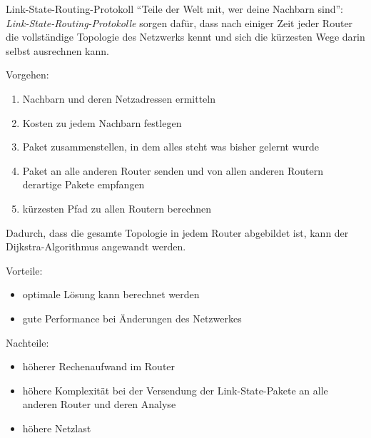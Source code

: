 \begin{defi}{Link-State-Routing-Protokoll}
    \enquote{Teile der Welt mit, wer deine Nachbarn sind}: \emph{Link-State-Routing-Protokolle} sorgen dafür, dass nach einiger Zeit jeder Router die vollständige Topologie des Netzwerks kennt und sich die kürzesten Wege darin selbst ausrechnen kann.

    Vorgehen:
    \begin{enumerate}
        \item Nachbarn und deren Netzadressen ermitteln
        \item Kosten zu jedem Nachbarn festlegen
        \item Paket zusammenstellen, in dem alles steht was bisher gelernt wurde
        \item Paket an alle anderen Router senden und von allen anderen Routern derartige Pakete empfangen
        \item kürzesten Pfad zu allen Routern berechnen
    \end{enumerate}

    Dadurch, dass die gesamte Topologie in jedem Router abgebildet ist, kann der Dijkstra-Algorithmus angewandt werden.

    Vorteile:
    \begin{itemize}
        \item optimale Lösung kann berechnet werden
        \item gute Performance bei Änderungen des Netzwerkes
    \end{itemize}

    Nachteile:
    \begin{itemize}
        \item höherer Rechenaufwand im Router
        \item höhere Komplexität bei der Versendung der Link-State-Pakete an alle anderen Router und deren Analyse
        \item höhere Netzlast
    \end{itemize}
\end{defi}


